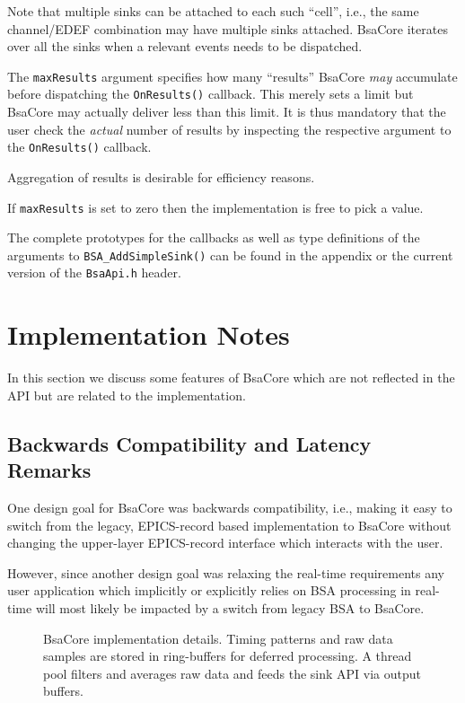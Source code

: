 \documentclass[11pt]{article}
\newcommand{\bsac}{BsaCore}
\newcommand{\bsa} {BSA}
\newcommand{\EDEF}{EDEF}
\newcommand{\cod}[1]{{\tt#1}}
\newcounter{figs}
\newcommand{\fig}[3][0]{
\refstepcounter{figs}
\hfill\resizebox{#2}{!}{
        \rotatebox{#1}{\texttt{[image: \#3]}}}\hspace*{\fill}
}
\begin{document}
Note that multiple sinks can be attached to each such ``cell'', i.e., the same
channel/\EDEF{} combination may have multiple sinks attached. \bsac{} iterates
over all the sinks when a relevant events needs to be dispatched.

The \cod{maxResults} argument specifies how many ``results'' \bsac{} {\em may}
accumulate before dispatching the \cod{OnResults()} callback. This merely
sets a limit but \bsac{} may actually deliver less than this limit. It is
thus mandatory that the user check the {\em actual} number of results
by inspecting the respective argument to the \cod{OnResults()} callback.

Aggregation of results is desirable for efficiency reasons.

If \cod{maxResults} is set to zero then the implementation is free to pick
a value.

The complete prototypes for the callbacks as well as type definitions of the
arguments to \cod{BSA\_AddSimpleSink()} can be found in the appendix or the
current version of the \cod{BsaApi.h} header.

\section{Implementation Notes}
In this section we discuss some features of \bsac{} which are not reflected
in the API but are related to the implementation.
\subsection{Backwards Compatibility and Latency Remarks}
\label{sec:latency}
One design goal for \bsac{} was backwards compatibility, i.e., making it easy
to switch from the legacy, EPICS-record based implementation to \bsac{} without
changing the upper-layer EPICS-record interface which interacts with the user.

However, since another design goal was relaxing the real-time requirements
any user application which implicitly or explicitly relies on \bsa{} processing
in real-time will most likely be impacted by a switch from legacy \bsa{} to
\bsac{}.

\begin{figure}
\fig{0.5\textwidth}{fig_impl.eps}
\label{fig:impl}
\caption{\bsac{} implementation details. Timing patterns and raw data samples
         are stored in ring-buffers for deferred processing. A thread pool
         filters and averages raw data and feeds the sink API via output
         buffers.}
\end{figure}
\end{document}
